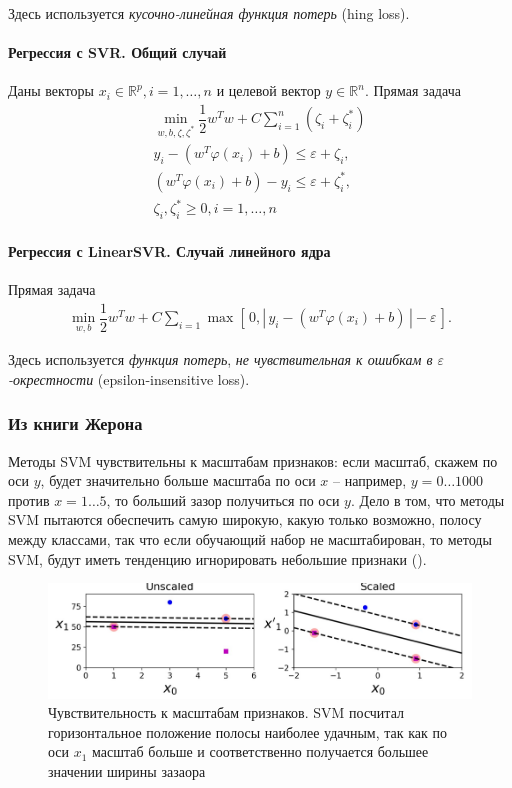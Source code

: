 \documentclass[%
	11pt,
	a4paper,
	utf8,
		]{article}
\begin{document}
Здесь используется \emph{кусочно-линейная функция потерь} (hing loss).

\paragraph{Регрессия с SVR. Общий случай}

Даны векторы $ x_i \in \mathbb{R}^p, i = 1, \ldots, n $ и целевой вектор $ y \in \mathbb{R}^n $. Прямая задача
\begin{align*}
	\min_{w, b, \zeta, \zeta^*} \dfrac{1}{2} w^T w + C \sum_{i=1}^n (\zeta_i + \zeta_i^*)\\
	y_i - (w^T \varphi(x_i) + b) \leqslant \varepsilon + \zeta_i, \\
	(w^T \varphi (x_i) + b) - y_i \leqslant \varepsilon + \zeta_i^*, \\
	\zeta_i, \zeta_i^* \geqslant 0, i = 1, \ldots, n
\end{align*}

\paragraph{Регрессия с LinearSVR. Случай линейного ядра}

Прямая задача
\begin{align*}
	\min_{w, b} \dfrac{1}{2} w^T w + C \sum_{i=1} \max [\, 0, |\, y_i - (w^T \varphi(x_i) + b) \,| - \varepsilon \,].
\end{align*}

Здесь используется \emph{функция потерь}, {\itshape не чувствительная к ошибкам в $ \varepsilon $-окрестности} (epsilon-insensitive loss).

\subsubsection{Из книги Жерона}

Методы SVM чувствительны к масштабам признаков: если масштаб, скажем по оси $ y $, будет значительно больше масштаба по оси $ x $ -- например, $ y = 0\ldots1000 $ против $ x = 1\ldots5 $, то б\emph{о}льший зазор получиться по оси $ y $. Дело в том, что методы SVM пытаются обеспечить самую широкую, какую только возможно, полосу между классами, так что если обучающий набор не масштабирован, то методы SVM, будут иметь тенденцию игнорировать небольшие признаки \cite[]{geron:hands_on_ml} ().

\begin{figure}[h]
	\centering
	\includegraphics[scale=0.9]{figures/svm_scale.png}
	\caption{ Чувствительность к масштабам признаков. SVM посчитал горизонтальное положение полосы наиболее удачным, так как по оси $ x_1 $ масштаб больше и соответственно получается большее значении ширины зазаора }\label{fig:svm_scale}
\end{figure}
\end{document}

